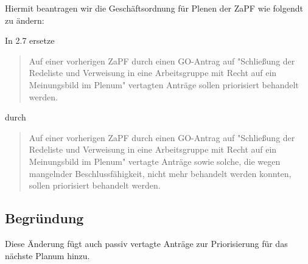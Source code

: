 \documentclass[draft,10pt,oneside]{scrartcl}
\begin{document}
Hiermit beantragen wir die Geschäftsordnung für Plenen der ZaPF wie folgendt zu
ändern:

In 2.7 ersetze
\begin{quote}
	Auf einer vorherigen ZaPF durch einen GO-Antrag auf "Schließung der
	Redeliste und Verweisung in eine Arbeitsgruppe mit Recht auf ein
	Meinungsbild im Plenum" vertagten Anträge sollen priorisiert behandelt
	werden.
\end{quote}
durch
\begin{quote}
	Auf einer vorherigen ZaPF durch einen GO-Antrag auf "Schließung der
	Redeliste und Verweisung in eine Arbeitsgruppe mit Recht auf ein
	Meinungsbild im Plenum" vertagte Anträge sowie solche, die wegen mangelnder
	Beschlussfähigkeit, nicht mehr behandelt werden konnten, sollen priorisiert
	behandelt werden.
\end{quote}

\subsection*{Begründung}
Diese Änderung fügt auch passiv vertagte Anträge zur Priorisierung für das
nächste Planum hinzu.
\end{document}

